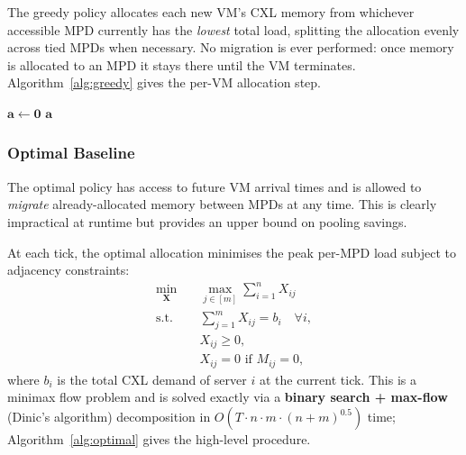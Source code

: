 \documentclass[11pt]{article}
\begin{document}
The greedy policy allocates each new VM's CXL memory from whichever
accessible MPD currently has the \emph{lowest} total load, splitting the
allocation evenly across tied MPDs when necessary.  No migration is ever
performed: once memory is allocated to an MPD it stays there until the VM
terminates. Algorithm~\ref{alg:greedy} gives the per-VM allocation step.

\begin{algorithm}[H]
\SetAlgoLined
\DontPrintSemicolon
\caption{Greedy allocation for a single VM arrival.}
\label{alg:greedy}
\BlankLine
$\mathbf{a} \leftarrow \mathbf{0}$\;
\Return $\mathbf{a}$\;
\end{algorithm}

\subsubsection*{Optimal Baseline}

The optimal policy has access to future VM arrival times and is allowed to
\emph{migrate} already-allocated memory between MPDs at any time.  This is
clearly impractical at runtime but provides an upper bound on pooling savings.

At each tick, the optimal allocation minimises the peak per-MPD load subject
to adjacency constraints:
\begin{equation}
\begin{aligned}
\min_{\mathbf{X}} \quad & \max_{j \in [m]} \sum_{i=1}^{n} X_{ij} \\
\text{s.t.} \quad & \sum_{j=1}^{m} X_{ij} = b_i \quad \forall i, \\
                  & X_{ij} \ge 0, \\
                  & X_{ij} = 0 \text{ if } M_{ij} = 0,
\end{aligned}
\label{eq:opt}
\end{equation}
where $b_i$ is the total CXL demand of server $i$ at the current tick.
This is a minimax flow problem and is solved exactly via a
\textbf{binary search + max-flow} (Dinic's algorithm) decomposition in
$O(T \cdot n \cdot m \cdot (n + m)^{0.5})$ time; Algorithm~\ref{alg:optimal}
gives the high-level procedure.
\end{document}
